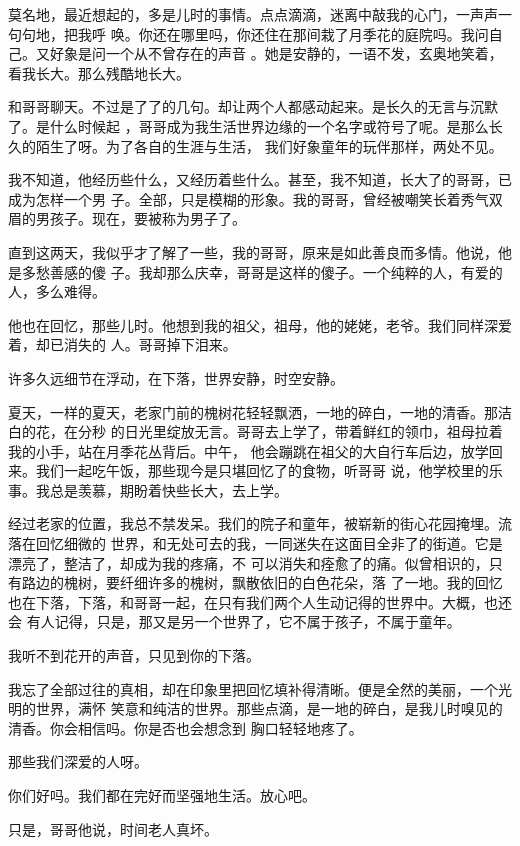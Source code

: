 \documentclass[12pt,a4paper]{article}
\def\blankrev{\vspace{1ex}}									%
\begin{document}
		莫名地，最近想起的，多是儿时的事情。点点滴滴，迷离中敲我的心门，一声声一句句地，把我呼
	唤。你还在哪里吗，你还住在那间栽了月季花的庭院吗。我问自己。又好象是问一个从不曾存在的声音
	。她是安静的，一语不发，玄奥地笑着，看我长大。那么残酷地长大。

		和哥哥聊天。不过是了了的几句。却让两个人都感动起来。是长久的无言与沉默了。是什么时候起
	，哥哥成为我生活世界边缘的一个名字或符号了呢。是那么长久的陌生了呀。为了各自的生涯与生活，
	我们好象童年的玩伴那样，两处不见。

		我不知道，他经历些什么，又经历着些什么。甚至，我不知道，长大了的哥哥，已成为怎样一个男
	子。全部，只是模糊的形象。我的哥哥，曾经被嘲笑长着秀气双眉的男孩子。现在，要被称为男子了。

		直到这两天，我似乎才了解了一些，我的哥哥，原来是如此善良而多情。他说，他是多愁善感的傻
	子。我却那么庆幸，哥哥是这样的傻子。一个纯粹的人，有爱的人，多么难得。

		他也在回忆，那些儿时。他想到我的祖父，祖母，他的姥姥，老爷。我们同样深爱着，却已消失的
	人。哥哥掉下泪来。

		许多久远细节在浮动，在下落，世界安静，时空安静。

		夏天，一样的夏天，老家门前的槐树花轻轻飘洒，一地的碎白，一地的清香。那洁白的花，在分秒
	的日光里绽放无言。哥哥去上学了，带着鲜红的领巾，祖母拉着我的小手，站在月季花丛背后。中午，
	他会蹦跳在祖父的大自行车后边，放学回来。我们一起吃午饭，那些现今是只堪回忆了的食物，听哥哥
	说，他学校里的乐事。我总是羡慕，期盼着快些长大，去上学。

		经过老家的位置，我总不禁发呆。我们的院子和童年，被崭新的街心花园掩埋。流落在回忆细微的
	世界，和无处可去的我，一同迷失在这面目全非了的街道。它是漂亮了，整洁了，却成为我的疼痛，不
	可以消失和痊愈了的痛。似曾相识的，只有路边的槐树，要纤细许多的槐树，飘散依旧的白色花朵，落
	了一地。我的回忆也在下落，下落，和哥哥一起，在只有我们两个人生动记得的世界中。大概，也还会
	有人记得，只是，那又是另一个世界了，它不属于孩子，不属于童年。

		\blankrev
		我听不到花开的声音，只见到你的下落。

		我忘了全部过往的真相，却在印象里把回忆填补得清晰。便是全然的美丽，一个光明的世界，满怀
	笑意和纯洁的世界。那些点滴，是一地的碎白，是我儿时嗅见的清香。你会相信吗。你是否也会想念到
	胸口轻轻地疼了。

		\blankrev
		那些我们深爱的人呀。\par
		你们好吗。我们都在完好而坚强地生活。放心吧。

		只是，哥哥他说，时间老人真坏。
\end{document}
